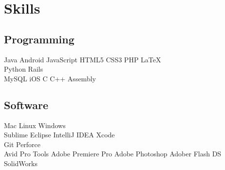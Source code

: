 \documentclass[letterpaper]{deedy-resume} %
\begin{document}
\begin{minipage}[t]{0.33\textwidth}
\sectionspace %


\section{Skills}

\subsection{Programming}

Java \textbullet{}
Android \textbullet{}
JavaScript \textbullet{}
HTML5 \textbullet{}
CSS3 \textbullet{}
PHP \textbullet{}
\LaTeX\ \\
Python \textbullet{}
Rails \\
MySQL \textbullet{}
iOS \textbullet{}
C \textbullet{}
C++ \textbullet{}
Assembly \\

\sectionspace %

\subsection{Software}
Mac \textbullet{}
Linux \textbullet{}
Windows \\
Sublime \textbullet{}
Eclipse \textbullet{}
IntelliJ IDEA \textbullet{}
Xcode \\
Git \textbullet{}
Perforce \\
Avid Pro Tools \textbullet{}
Adobe Premiere Pro \textbullet{}
Adobe Photoshop \textbullet{}
Adober Flash \textbullet{}
DS SolidWorks \\



\sectionspace %


\end{minipage} %
\hfill
%
\end{document}
